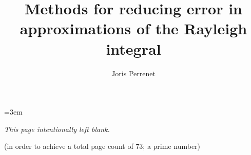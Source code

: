 \documentclass{TUD-report2020}
\begin{document}
\renewcommand\UrlFont{\color{tudelft-cyan}\ttfamily}
\newcommand\Chapter[2]{
  \chapter[#1: {\itshape#2}]{#1\\[0ex]\Large\itshape#2}
}


\frontmatter

\title[tudelft-black]{Methods for reducing error in approximations of the Rayleigh integral}
\author[tudelft-white]{Joris Perrenet}

\makecover









{
    \hypersetup{linkcolor=black}
    \tableofcontents
}

\mainmatter







% 
% 

\appendix





{
    \emergencystretch=3em
    \hypersetup{citecolor=black, urlcolor=black, linkcolor=black}
    \printbibliography[heading=bibintoc]
}

\clearpage
\vspace*{\fill}
\hfill
\begin{center}
\textsl{This page intentionally left blank.}

\vspace{2em}

\footnotesize{(in order to achieve a total page count of 73; a prime number)}
\end{center}
\vspace{\fill}
\thispagestyle{empty}
\newpage
\if@twocolumn\hbox{}\newpage\fi
\end{document}
